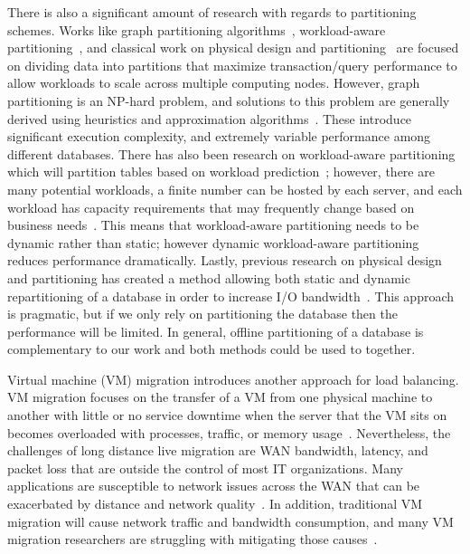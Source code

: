 There is also a significant amount of research with regards to partitioning schemes. Works like graph partitioning algorithms~\cite{Karypis:1998:FHQ:305219.305248}, workload-aware partitioning~\cite{Scholl:2009:WDP:1516360.1516366}, and classical work on physical design and partitioning~\cite{Zilio:1998:PDD:928651} are focused on dividing data into partitions that maximize transaction/query performance to allow workloads to scale across multiple computing nodes. However, graph partitioning is an NP-hard problem, and solutions to this problem are generally derived using heuristics and approximation algorithms~\cite{citeulike:11192678}. These introduce significant execution complexity, and extremely variable performance among different databases. There has also been research on workload-aware partitioning which will partition tables based on workload prediction~\cite{Scholl:2009:WDP:1516360.1516366, Mit-Shinobi}; however, there are many potential workloads, a ﬁnite number can be hosted by each server, and each workload has capacity requirements that may frequently change based on business needs~\cite{Gmach:2007:WAD:1524302.1524818}. This means that workload-aware partitioning needs to be dynamic rather than static; however dynamic workload-aware partitioning reduces performance dramatically. Lastly, previous research on physical design and partitioning has created a method allowing both static and dynamic repartitioning of a database in order to increase I/O bandwidth~\cite{Zilio:1998:PDD:928651}. This approach is pragmatic, but if we only rely on partitioning the database then the performance will be limited. In general, offline partitioning of a database is complementary to our work and both methods could be used to together.
 
Virtual machine (VM) migration introduces another approach for load balancing. VM migration focuses on the transfer of a VM from one physical machine to another with little or no service downtime when the server that the VM sits on becomes overloaded with processes, traffic, or memory usage~\cite{Clark:2005:LMV:1251203.1251223}. Nevertheless, the challenges of long distance live migration are WAN bandwidth, latency, and packet loss that are outside the control of most IT organizations. Many applications are susceptible to network issues across the WAN that can be exacerbated by distance and network quality~\cite{murphyVMWare}. In addition, traditional VM migration will cause network traffic and bandwidth consumption, and many VM migration researchers are struggling with mitigating those causes~\cite{Liu:2009:LMV:1551609.1551630}.
